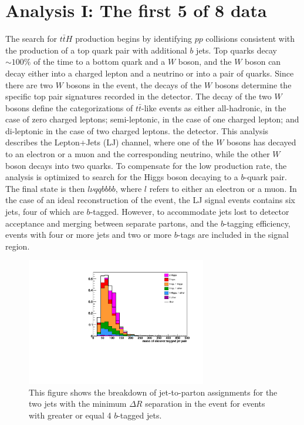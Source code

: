\chapter{Analysis I: The first 5 \fbinv of 8 \TeV data}
\label{analysis_1_overview}

\par The search for $t\bar{t}H$ production begins by identifying $pp$
collisions consistent with the production of a top quark pair with
additional $b$ jets.  Top quarks decay $\sim100\%$ of the time to a
bottom quark and a $W$ boson, and the $W$ boson can decay either into
a charged lepton and a neutrino or into a pair of quarks.  Since there are two $W$ bosons in
the event, the decays of the $W$ bosons determine the specific top
pair signatures recorded in the detector.  The decay of the two $W$
bosons define the categorizations of $t\bar{t}$-like events as either
all-hadronic, in the case of zero charged leptons; semi-leptonic, in
the case of one charged lepton; and di-leptonic in the case of two
charged leptons.  the detector. This analysis describes the
Lepton+Jets (LJ) channel, where one of the $W$ bosons has decayed to an
electron or a muon and the corresponding neutrino, while the other $W$
boson decays into two quarks.  To compensate for the low production
rate, the analysis is optimized to search for the Higgs boson decaying
to a $b$-quark pair.  The final state is then $l \nu qqbbbb$, where
$l$ refers to either an electron or a muon.  In the case of an ideal
reconstruction of the event, the LJ signal events contains six jets,
four of which are $b$-tagged. However, to accommodate jets lost to
detector acceptance and merging between separate partons, and the
$b$-tagging efficiency, events with four or more jets and two or more
$b$-tags are included in the signal region.  

\begin{figure}[h]
  \centering
  \includegraphics[width=0.7\textwidth]{Figures/Analysis_1_Diagrams/h_closestDR_mass_tag_tag_ge4t_rebin.pdf}
  \caption{This figure shows the breakdown of jet-to-parton
   assignments for the two jets with the minimum $\Delta R$
  separation in the event for events with greater or equal 4
  $b$-tagged jets.}\label{fig:tagMassCombinatorics}  
\end{figure}

